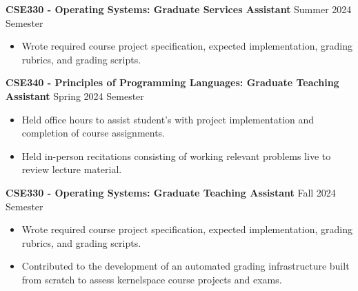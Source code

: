 \textbf{CSE330 - Operating Systems: Graduate Services Assistant} \hfill Summer 2024 Semester
\begin{itemize}
    \item Wrote required course project specification, expected implementation, grading rubrics, and grading scripts.
\end{itemize}
\textbf{CSE340 - Principles of Programming Languages: Graduate Teaching Assistant} \hfill Spring 2024 Semester
\begin{itemize}
    \item Held office hours to assist student's with project implementation and completion of course assignments.
    \item Held in-person recitations consisting of working relevant problems live to review lecture material.
\end{itemize}
\textbf{CSE330 - Operating Systems: Graduate Teaching Assistant} \hfill Fall 2024 Semester
\begin{itemize}
    \item Wrote required course project specification, expected implementation, grading rubrics, and grading scripts.
    \item Contributed to the development of an automated grading infrastructure built from scratch to assess kernelspace course projects and exams.
\end{itemize}
